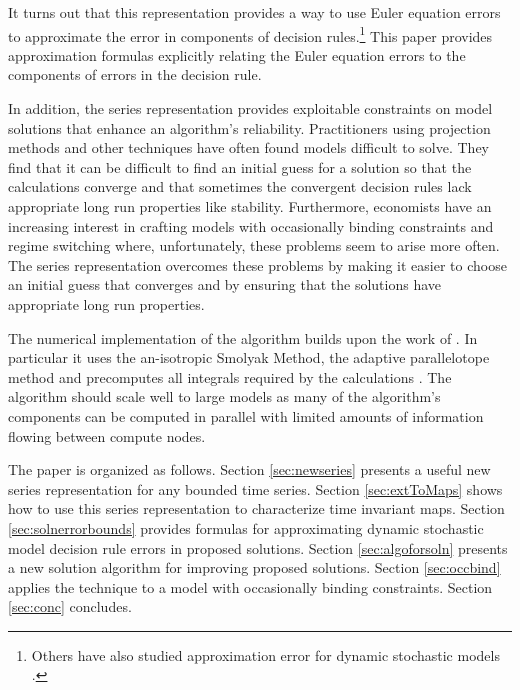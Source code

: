 \documentclass[12pt]{article}
\begin{document}
    It turns out that this representation provides a way to use
    Euler equation errors to
    approximate the error in components of 
    decision rules.\footnote{    Others have also studied approximation error for dynamic stochastic models \citep{judd2017lower,santos2005accuracy,Santos2000accuracy}.} This paper provides  approximation formulas
    explicitly relating the
    Euler equation errors to the components of
    errors in the decision rule.

In addition, the series representation provides exploitable constraints on model solutions that enhance an algorithm's reliability.
Practitioners using projection methods and other techniques
have often found models difficult to solve.
They find that
it can be difficult to find an initial guess for a solution so that 
the calculations converge and that sometimes the convergent decision rules
lack appropriate long run properties like stability.
Furthermore, economists have an increasing interest in crafting models with
occasionally binding constraints and regime switching where, unfortunately, these problems seem to arise more often.
The series representation overcomes these problems by making it easier to choose an initial guess
that converges and by ensuring that the solutions have appropriate long run 
properties.



The numerical implementation of the algorithm 
builds upon the work of
\citep{juddGSSA2011,NBERw17418}.
In particular it uses
the an-isotropic Smolyak Method, the adaptive
parallelotope method \citep{Judd2014}
and precomputes all integrals required by the calculations  \citep{NBERw17418}.
The algorithm should scale well to large models as many 
of the algorithm's components can be computed in parallel with limited amounts of information flowing between compute nodes.











The paper is organized as follows.
Section \ref{sec:newseries} presents a useful new series representation for any bounded time series.
Section \ref{sec:extToMaps} shows how to use this series representation to characterize time invariant maps.
Section \ref{sec:solnerrorbounds} provides formulas for approximating dynamic stochastic model decision rule errors in proposed solutions.
Section \ref{sec:algoforsoln} presents a new solution algorithm for improving proposed solutions.
Section \ref{sec:occbind} applies the technique to a model with 
occasionally binding constraints.
Section \ref{sec:conc} concludes.
\end{document}
